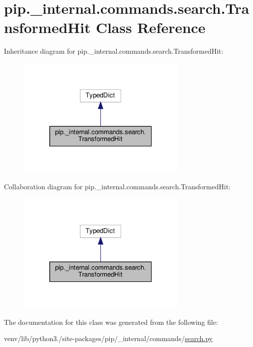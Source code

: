 \hypertarget{classpip_1_1__internal_1_1commands_1_1search_1_1TransformedHit}{}\section{pip.\+\_\+internal.\+commands.\+search.\+Transformed\+Hit Class Reference}
\label{classpip_1_1__internal_1_1commands_1_1search_1_1TransformedHit}


Inheritance diagram for pip.\+\_\+internal.\+commands.\+search.\+Transformed\+Hit\+:
\nopagebreak
\begin{figure}[H]
\begin{center}
\leavevmode
\includegraphics[width=235pt]{classpip_1_1__internal_1_1commands_1_1search_1_1TransformedHit__inherit__graph}
\end{center}
\end{figure}


Collaboration diagram for pip.\+\_\+internal.\+commands.\+search.\+Transformed\+Hit\+:
\nopagebreak
\begin{figure}[H]
\begin{center}
\leavevmode
\includegraphics[width=235pt]{classpip_1_1__internal_1_1commands_1_1search_1_1TransformedHit__coll__graph}
\end{center}
\end{figure}


The documentation for this class was generated from the following file\+:\begin{DoxyCompactItemize}
\item 
venv/lib/python3./site-\/packages/pip/\+\_\+internal/commands/\hyperlink{search_8py}{search.\+py}\end{DoxyCompactItemize}
